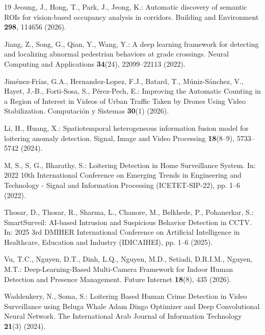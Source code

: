 \documentclass[runningheads]{llncs}
\begin{document}
\begin{thebibliography}{19}
Jeoung, J., Hong, T., Park, J., Jeong, K.: Automatic discovery of semantic ROIs for vision-based occupancy analysis in corridors. Building and Environment \textbf{298}, 114656 (2026). 

Jiang, Z., Song, G., Qian, Y., Wang, Y.: A deep learning framework for detecting and localizing abnormal pedestrian behaviors at grade crossings. Neural Computing and Applications \textbf{34}(24), 22099--22113 (2022). 

Jiménez-Frías, G.A., Hernandez-Lopez, F.J., Batard, T., Múniz-Sánchez, V., Hayet, J.-B., Forti-Sosa, S., Pérez-Pech, E.: Improving the Automatic Counting in a Region of Interest in Videos of Urban Traffic Taken by Drones Using Video Stabilization. Computación y Sistemas \textbf{30}(1) (2026). 

Li, H., Huang, X.: Spatiotemporal heterogeneous information fusion model for loitering anomaly detection. Signal, Image and Video Processing \textbf{18}(8--9), 5733--5742 (2024). 

M, S., S, G., Bharathy, S.: Loitering Detection in Home Surveillance System. In: 2022 10th International Conference on Emerging Trends in Engineering and Technology - Signal and Information Processing (ICETET-SIP-22), pp. 1--6 (2022). 

Thosar, D., Thosar, R., Sharma, L., Chanore, M., Belkhede, P., Pohanerkar, S.: SmartSurveil: AI-based Intrusion and Suspicious Behavior Detection in CCTV. In: 2025 3rd DMIHER International Conference on Artificial Intelligence in Healthcare, Education and Industry (IDICAIHEI), pp. 1--6 (2025). 

Vu, T.C., Nguyen, D.T., Dinh, L.Q., Nguyen, M.D., Setiadi, D.R.I.M., Nguyen, M.T.: Deep-Learning-Based Multi-Camera Framework for Indoor Human Detection and Presence Management. Future Internet \textbf{18}(8), 435 (2026). 

Waddenkery, N., Soma, S.: Loitering Based Human Crime Detection in Video Surveillance using Beluga Whale Adam Dingo Optimizer and Deep Convolutional Neural Network. The International Arab Journal of Information Technology \textbf{21}(3) (2024). 


\end{thebibliography}
\end{document}
